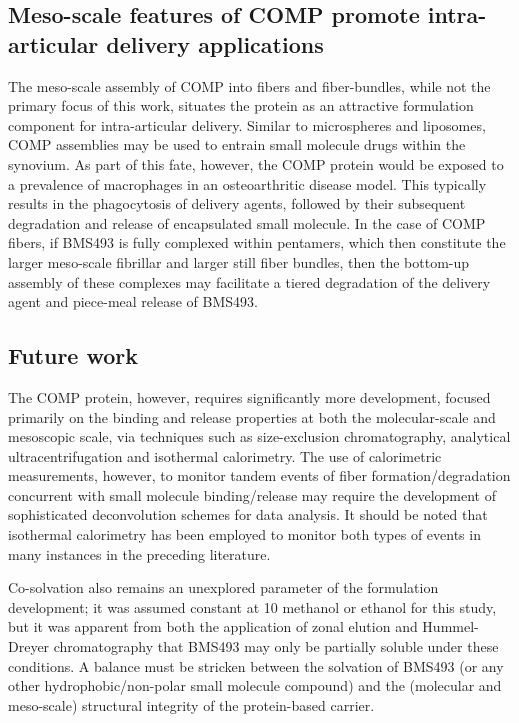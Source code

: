 \begin{refsection}
\subsection{Meso-scale features of COMP promote intra-articular delivery
applications}
The meso-scale assembly of COMP into fibers and fiber-bundles, while not the
primary focus of this work, situates the protein as an attractive formulation
component for intra-articular delivery.\cite{Gerwin2006} Similar to
microspheres and liposomes, COMP assemblies may be used to entrain small
molecule drugs within the synovium. As part of this fate, however, the COMP
protein would be exposed to a prevalence of macrophages in an osteoarthritic
disease model. This typically results in the phagocytosis of delivery agents,
followed by their subsequent degradation and release of encapsulated small
molecule. In the case of COMP fibers, if BMS493 is fully complexed within
pentamers, which then constitute the larger meso-scale fibrillar and larger
still fiber bundles, then the bottom-up assembly of these complexes may
facilitate a tiered degradation of the delivery agent and piece-meal release of
BMS493.

\subsection{Future work}
The COMP protein, however, requires significantly more development, focused
primarily on the binding and release properties at both the molecular-scale and
mesoscopic scale, via techniques such as size-exclusion chromatography,
analytical ultracentrifugation and isothermal calorimetry. The use of
calorimetric measurements, however, to monitor tandem events of fiber
formation/degradation concurrent with small molecule binding/release may require
the development of sophisticated deconvolution schemes for data analysis. It
should be noted that isothermal calorimetry has been employed to monitor both
types of events in many instances in the preceding literature.\cite{Kardos2004}

Co-solvation also remains an unexplored parameter of the formulation
development; it was assumed constant at \SI{10}{\volper} methanol or ethanol for
this study, but it was apparent from both the application of zonal elution and
Hummel-Dreyer chromatography that BMS493 may only be partially soluble under
these conditions. A balance must be stricken between the solvation of BMS493 (or
any other hydrophobic/non-polar small molecule compound) and the (molecular and
meso-scale) structural integrity of the protein-based carrier.

\printbibliography[heading=subbibliography]

\end{refsection}
